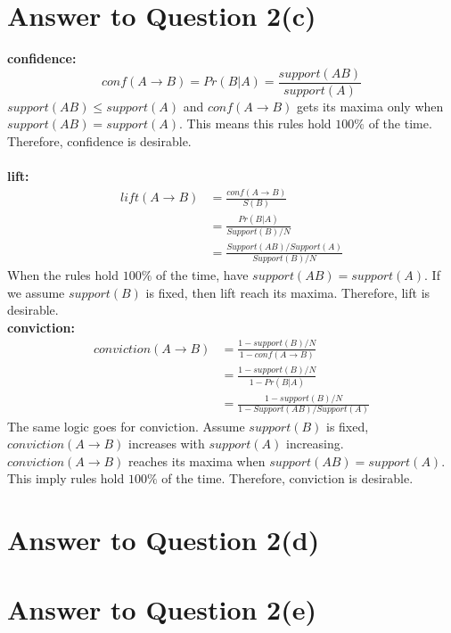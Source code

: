 \documentclass[11pt]{article}
\begin{document}
\pagebreak[4]
\section*{Answer to Question 2(c)}
\textbf{confidence: }\\
\begin{equation}
    conf(A\rightarrow B) = Pr(B|A) = \frac{support(AB)}{support(A)}
\end{equation}
$support(AB) \leq support(A)$ and $conf(A\rightarrow B)$ gets its maxima only when $support(AB) = support(A)$.
This means this rules hold $100\%$ of the time. Therefore, confidence is desirable.\\
\\
\textbf{lift: }
\begin{equation}
\begin{aligned}
    lift(A\rightarrow B) & = \frac{conf(A\rightarrow B)}{S(B)}\\
    & = \frac{Pr(B|A)}{Support(B)/N}\\
    & = \frac{Support(AB)/Support(A)}{Support(B)/N}
\end{aligned}
\end{equation}
When the rules hold $100\%$ of the time, have $support(AB) = support(A)$.
If we assume $support(B)$ is fixed, then lift reach its maxima. Therefore, lift is desirable.
\\
\textbf{conviction: }
\begin{equation}
\begin{aligned}
    conviction(A\rightarrow B) & = \frac{1 - support(B)/N}{1 - conf(A\rightarrow B)}\\
    & = \frac{1 - support(B)/N}{1 - Pr(B|A)}\\
    & = \frac{1 - support(B)/N}{1 - Support(AB)/Support(A)}
\end{aligned}
\end{equation}
The same logic goes for conviction.
Assume $support(B)$ is fixed, $conviction(A\rightarrow B)$ increases with $support(A)$ increasing.
$conviction(A\rightarrow B)$ reaches its maxima when $support(AB) = support(A)$. This imply rules hold $100\%$ of the time.
Therefore, conviction is desirable.

\pagebreak[4]
\section*{Answer to Question 2(d)}

\pagebreak[4]
\section*{Answer to Question 2(e)}
\end{document}
